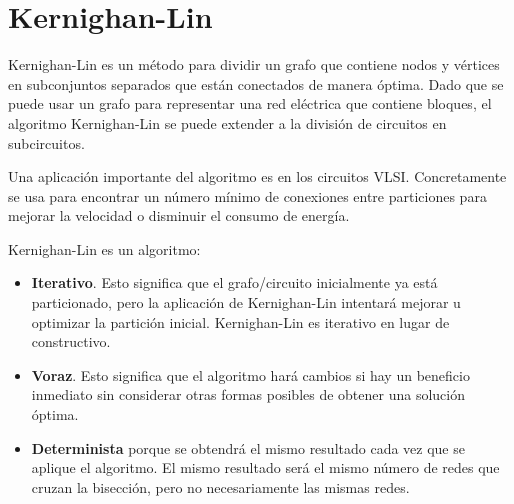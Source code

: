 
\section{Kernighan-Lin}
%
%

Kernighan-Lin es un método para dividir un grafo que contiene nodos y vértices en subconjuntos separados que están conectados de manera óptima. Dado que se puede usar un grafo para representar una red eléctrica que contiene bloques, el algoritmo Kernighan-Lin se puede extender a la división de circuitos en subcircuitos.

Una aplicación importante del algoritmo es en los circuitos VLSI\cite{KernighanLin}\cite{Ravikumar}. Concretamente se usa para encontrar un número mínimo de conexiones entre particiones para mejorar la velocidad o disminuir el consumo de energía.

Kernighan-Lin es un algoritmo:

\begin{itemize}
	\setlength{\parskip}{0pt}
	\setlength{\itemsep}{0pt plus 1pt}
	\item \textbf{Iterativo}. Esto significa que el grafo/circuito inicialmente ya está particionado, pero la aplicación de Kernighan-Lin intentará mejorar u optimizar la partición inicial. Kernighan-Lin es iterativo en lugar de constructivo.
	\item \textbf{Voraz}. Esto significa que el algoritmo hará cambios si hay un beneficio inmediato sin considerar otras formas posibles de obtener una solución óptima.
	\item \textbf{Determinista} porque se obtendrá el mismo resultado cada vez que se aplique el algoritmo. El mismo resultado será el mismo número de redes que cruzan la bisección, pero no necesariamente las mismas redes.
\end{itemize}


